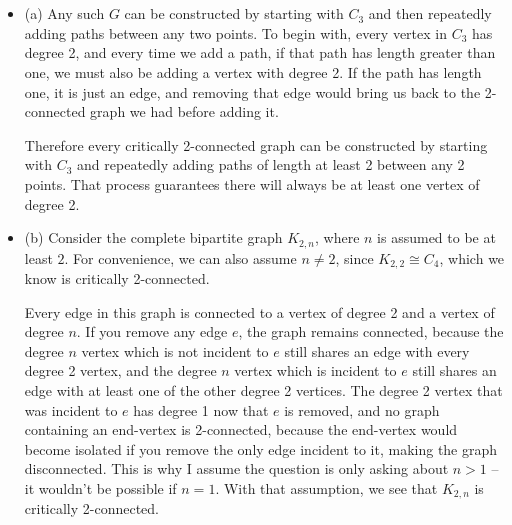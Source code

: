 \documentclass[12pt]{article}
\begin{document}
\section{}
\noindent{}\bigskip\par
\begin{itemize}
    \item (a) Any such $G$ can be constructed by starting with $C_3$ and then repeatedly adding paths between any two points. To begin with, every vertex in $C_3$ has degree 2, and every time we add a path, if that path has length greater than one, we must also be adding a vertex with degree 2. If the path has length one, it is just an edge, and removing that edge would bring us back to the 2-connected graph we had before adding it.
        \par
        Therefore every critically 2-connected graph can be constructed by starting with $C_3$ and repeatedly adding paths of length at least 2 between any 2 points. That process guarantees there will always be at least one vertex of degree 2.
    \item (b) Consider the complete bipartite graph $K_{2,n}$, where $n$ is assumed to be at least $2$. For convenience, we can also assume $n \neq 2$, since $K_{2,2} \cong C_4$, which we know is critically 2-connected.
        \par
        Every edge in this graph is connected to a vertex of degree 2 and a vertex of degree $n$. If you remove any edge $e$, the graph remains connected, because the degree $n$ vertex which is not incident to $e$ still shares an edge with every degree 2 vertex, and the degree $n$ vertex which is incident to $e$ still shares an edge with at least one of the other degree 2 vertices. The degree 2 vertex that was incident to $e$ has degree 1 now that $e$ is removed, and no graph containing an end-vertex is 2-connected, because the end-vertex would become isolated if you remove the only edge incident to it, making the graph disconnected. This is why I assume the question is only asking about $n>1$ -- it wouldn't be possible if $n=1$. With that assumption, we see that $K_{2,n}$ is critically 2-connected.
\end{itemize}
\end{document}
